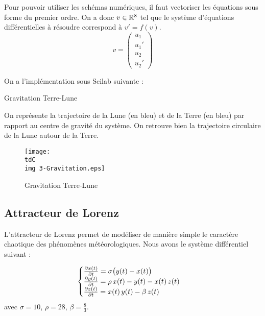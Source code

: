 		Pour pouvoir utiliser les schémas numériques, il faut vectoriser les équations sous forme du premier ordre. On a donc $v\in\mathbb{R}^8$ tel que le système d'équations différentielles à résoudre correspond à $v' = f(v)$.
		\begin{equation}
			\label{eq-3-gravit2Vect}
			v = \begin{pmatrix}
				u_1 	\\
				u_1' 	\\
				u_2 	\\
				u_2'
			\end{pmatrix}
		\end{equation}

		On a l'implémentation sous Scilab suivante :

		\begin{listing}[H]
			\caption{Gravitation Terre-Lune}
			\label{code-3-gravitation2}
		\end{listing}


		On représente la trajectoire de la Lune (en bleu) et de la Terre (en bleu) par rapport au centre de gravité du système. On retrouve bien la trajectoire circulaire de la Lune autour de la Terre.

		\begin{figure}[H]
			\centering
			\texttt{[image: \\tdC\\img 3-Gravitation.eps]}
			\caption{Gravitation Terre-Lune}
			\label{img-3-gravitation2}
		\end{figure}




	\subsection{Attracteur de Lorenz}


		L'attracteur de Lorenz permet de modéliser de manière simple le caractère chaotique des phénomènes météorologiques. Nous avons le système différentiel suivant :

		\begin{equation}
			\label{eq-3-systLorenz}
			\begin{cases}
				\frac{\partial x(t)}{\partial t} = \sigma \bigl( y(t) - x(t) \bigr) \\
				\frac{\partial y(t)}{\partial t} = \rho \, x(t) - y(t) - x(t) \, z(t)\\
				\frac{\partial z(t)}{\partial t} = x(t) \, y(t) - \beta \, z(t) 
			\end{cases}
		\end{equation}
		avec $\sigma = 10$, $\rho = 28$, $\beta = \frac{8}{3}$.

